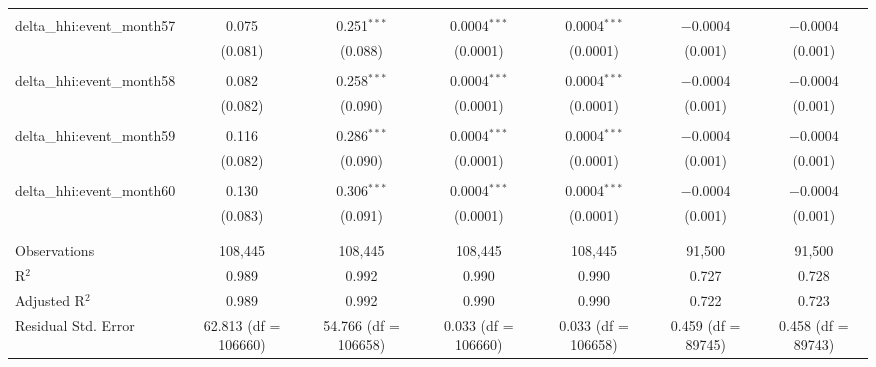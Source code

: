 \begin{table}[H]
{\begin{tabular}{@{\extracolsep{5pt}}lcccccc}
   & & & & & & \\  

  delta\_hhi:event\_month57 & 0.075 & 0.251$^{***}$ & 0.0004$^{***}$ & 0.0004$^{***}$ & $-$0.0004 & $-$0.0004 \\  

   & (0.081) & (0.088) & (0.0001) & (0.0001) & (0.001) & (0.001) \\  

   & & & & & & \\  

  delta\_hhi:event\_month58 & 0.082 & 0.258$^{***}$ & 0.0004$^{***}$ & 0.0004$^{***}$ & $-$0.0004 & $-$0.0004 \\  

   & (0.082) & (0.090) & (0.0001) & (0.0001) & (0.001) & (0.001) \\  

   & & & & & & \\  

  delta\_hhi:event\_month59 & 0.116 & 0.286$^{***}$ & 0.0004$^{***}$ & 0.0004$^{***}$ & $-$0.0004 & $-$0.0004 \\  

   & (0.082) & (0.090) & (0.0001) & (0.0001) & (0.001) & (0.001) \\  

   & & & & & & \\  

  delta\_hhi:event\_month60 & 0.130 & 0.306$^{***}$ & 0.0004$^{***}$ & 0.0004$^{***}$ & $-$0.0004 & $-$0.0004 \\  

   & (0.083) & (0.091) & (0.0001) & (0.0001) & (0.001) & (0.001) \\  

   & & & & & & \\  

 \hline \\[-1.8ex]  

 Observations & 108,445 & 108,445 & 108,445 & 108,445 & 91,500 & 91,500 \\  

 R$^{2}$ & 0.989 & 0.992 & 0.990 & 0.990 & 0.727 & 0.728 \\  

 Adjusted R$^{2}$ & 0.989 & 0.992 & 0.990 & 0.990 & 0.722 & 0.723 \\  

 Residual Std. Error & 62.813 (df = 106660) & 54.766 (df = 106658) & 0.033 (df = 106660) & 0.033 (df = 106658) & 0.459 (df = 89745) & 0.458 (df = 89743) \\  


\end{tabular}}
\end{table}
